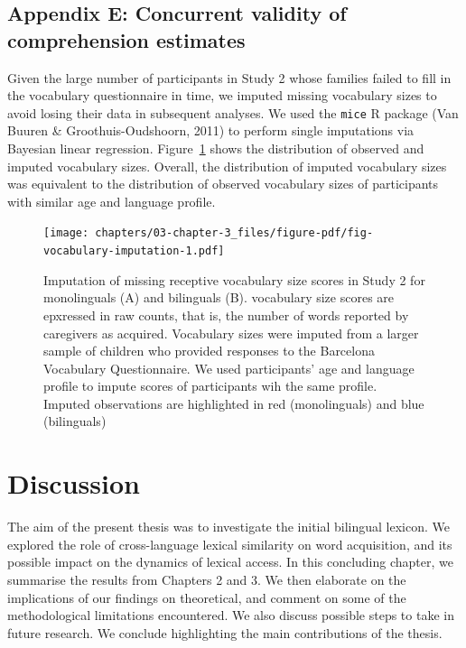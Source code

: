 \documentclass[
  12pt,
  b5paperpaper,
  twoside]{scrreprt}
\begin{document}
\newpage{}

\hypertarget{appendix-e-concurrent-validity-of-comprehension-estimates}{%
\section{Appendix E: Concurrent validity of comprehension
estimates}\label{appendix-e-concurrent-validity-of-comprehension-estimates}}

Given the large number of participants in Study 2 whose families failed
to fill in the vocabulary questionnaire in time, we imputed missing
vocabulary sizes to avoid losing their data in subsequent analyses. We
used the \texttt{mice} R package (Van Buuren \& Groothuis-Oudshoorn,
2011) to perform single imputations via Bayesian linear regression.
Figure~\ref{fig-vocabulary-imputation} shows the distribution of
observed and imputed vocabulary sizes. Overall, the distribution of
imputed vocabulary sizes was equivalent to the distribution of observed
vocabulary sizes of participants with similar age and language profile.

\begin{figure}

{\centering \texttt{[image: chapters/03-chapter-3\_files/figure-pdf/fig-vocabulary-imputation-1.pdf]}

}

\caption{\label{fig-vocabulary-imputation}Imputation of missing
receptive vocabulary size scores in Study 2 for monolinguals (A) and
bilinguals (B). vocabulary size scores are epxressed in raw counts, that
is, the number of words reported by caregivers as acquired. Vocabulary
sizes were imputed from a larger sample of children who provided
responses to the Barcelona Vocabulary Questionnaire. We used
participants' age and language profile to impute scores of participants
wih the same profile. Imputed observations are highlighted in red
(monolinguals) and blue (bilinguals)}

\end{figure}

\newpage{}


\hypertarget{discussion-2}{%
\chapter{Discussion}\label{discussion-2}}

The aim of the present thesis was to investigate the initial bilingual
lexicon. We explored the role of cross-language lexical similarity on
word acquisition, and its possible impact on the dynamics of lexical
access. In this concluding chapter, we summarise the results from
Chapters 2 and 3. We then elaborate on the implications of our findings
on theoretical, and comment on some of the methodological limitations
encountered. We also discuss possible steps to take in future research.
We conclude highlighting the main contributions of the thesis.
\end{document}
